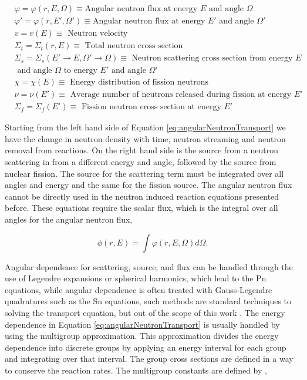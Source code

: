 \clearpage

$\begin{aligned}
&\varphi = \varphi(r, E, \Omega) \equiv   \text{Angular neutron flux at energy } E \text{ and angle } \Omega  \\
&\varphi' = \varphi(r, E', \Omega') \equiv   \text{Angular neutron flux at energy } E' \text{ and angle } \Omega'  \\
& v = v(E) \equiv \text{ Neutron velocity} \\
&\Sigma_{t} = \Sigma_{t}(r, E) \equiv \text{ Total neutron cross section} \\
&\Sigma_{s} = \Sigma_{s}(E' \rightarrow E,\Omega' \rightarrow \Omega) \equiv \text{ Neutron scattering cross section from energy } E \\
& \text{ and angle } \Omega \text{ to energy } E' \text{ and angle } \Omega' \\
&\chi = \chi(E) \equiv \text{ Energy distribution of fission neutrons} \\
&\nu = \nu(E') \equiv \text{ Average number of neutrons released during fission at energy } E' \\ 
&\Sigma_{f} = \Sigma_{f}(E') \equiv \text{ Fission neutron cross section at energy } E' 
\end{aligned}$

\vspace{0.5cm}

\noindent Starting from the left hand side of Equation \ref{eq:angularNeutronTransport} we have the change in neutron density with time, neutron streaming and neutron removal from reactions. On the right hand side is the source from a neutron scattering in from a different energy and angle, followed by the source from nuclear fission. The source for the scattering term must be integrated over all angles and energy and the same for the fission source. The angular neutron flux cannot be directly used in the neutron induced reaction equations presented before. These equations require the scalar flux, which is the integral over all angles for the angular neutron flux,

\begin{equation}
    \phi(r,E) = \int \varphi(r,E,\Omega)d \Omega.
\end{equation}

Angular dependence for scattering, source, and flux can be handled through the use of Legendre expansions or spherical harmonics, which lead to the Pn equations, while angular dependence is often treated with Gauss-Legendre quadratures such as the Sn equations, such methods are standard techniques to solving the transport equation, but out of the scope of this work \cite{millerCompTransport}. The energy dependence in Equation \ref{eq:angularNeutronTransport} is usually handled by using the multigroup approximation. This approximation divides the energy dependence into discrete groups by applying an energy interval for each group and integrating over that interval. The group cross sections are defined in a way to conserve the reaction rates. The multigroup constants are defined by \cite{millerCompTransport} \cite{duderstadt1976},

